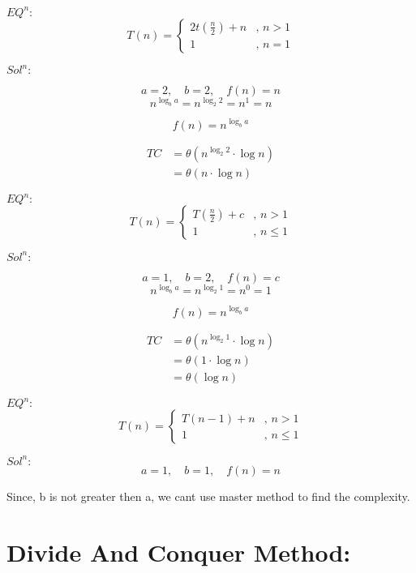 \documentclass{article}
\begin{document}
$EQ^n:$
\[
    T(n) = 
    \begin{cases}
        2t\left(\frac{n}{2}\right) + n & \text{, } n > 1 \\
        1 & \text{, } n = 1
    \end{cases}
\]

$Sol^n:$

\[
    a = 2, \quad b = 2, \quad f(n) = n
\]
\[
    n^{\log_b a} = n^{\log_2 2} = n^1 = n
\]

\[
    f(n) = n^{\log_b a}
\]

\begin{align*}
    TC &= \theta (n^{\log_2 2} \cdot \log n) \\
       &= \theta (n \cdot \log n) 
\end{align*}

\hrulefill
\vspace*{10pt}


$EQ^n:$
\[
    T(n) = 
    \begin{cases}
        T\left(\frac{n}{2}\right) + c & \text{, } n > 1 \\
        1 & \text{, } n \leq 1
    \end{cases}
\]

$Sol^n:$

\[
    a = 1, \quad b = 2, \quad f(n) = c
\]
\[
    n^{\log_b a} = n^{\log_2 1} = n^0 = 1
\]

\[
    f(n) = n^{\log_b a}
\]

\begin{align*}
    TC &= \theta (n^{\log_2 1} \cdot \log n) \\
       &= \theta (1 \cdot \log n)\\
       &= \theta (\log n)
\end{align*}

\hrulefill
\vspace*{10pt}

$EQ^n:$
\[
    T(n) = 
    \begin{cases}
        T\left({n-1}\right) + n & \text{, } n > 1 \\
        1 & \text{, } n \leq 1
    \end{cases}
\]

$Sol^n:$
\[
    a = 1, \quad b = 1, \quad f(n) = n
\]  

Since, b is not greater then a, we cant use master method to find the complexity.

\hrulefill
\newpage

\section*{Divide And Conquer Method:}
\end{document}
